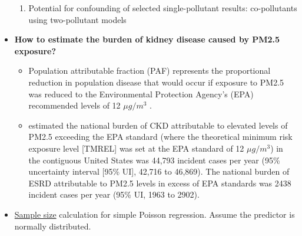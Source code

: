 \documentclass{article}
\begin{document}
\begin{itemize}
{\begin{enumerate}
            \item Potential for confounding of selected single-pollutant results: co-pollutants using two-pollutant models
        \end{enumerate}
    }
    \item \textbf{How to estimate the burden of kidney disease caused by PM2.5 exposure?} {
        \begin{itemize}
            \item Population attributable fraction (PAF) represents the proportional reduction in population disease that would occur if exposure to PM2.5 was reduced to the Environmental Protection Agency's (EPA) recommended levels of 12 $\mu g/m^3$ \citep{bowe2018particulate}.
            \item \citet{bowe2018particulate} estimated the national burden of CKD attributable to elevated levels of PM2.5 exceeding the EPA standard (where the theoretical minimum risk exposure level [TMREL] was set at the EPA standard of 12 $\mu g/m^3$) in the contiguous United States was 44,793 incident cases per year (95\% uncertainty interval [95\% UI], 42,716 to 46,869). The national burden of ESRD attributable to PM2.5 levels in excess of EPA standards was 2438 incident cases per year (95\% UI, 1963 to 2902). 
        \end{itemize}
    }
    \item \href{https://rdrr.io/cran/powerMediation/man/sizePoisson.html}{Sample size} calculation for simple Poisson regression. Assume the predictor is normally distributed. {
       
}
\end{itemize}
\end{document}
